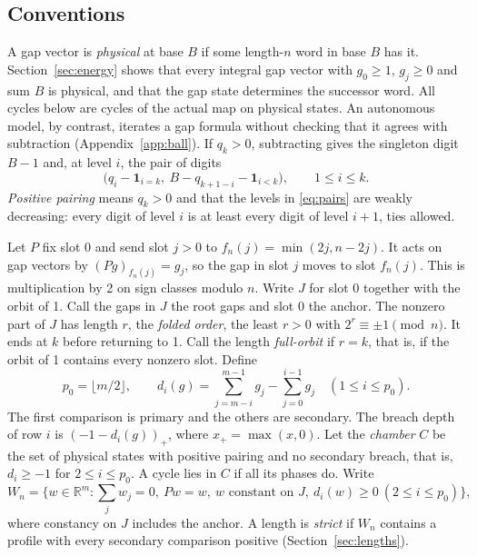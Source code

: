 \documentclass[11pt,reqno]{amsart}
\theoremstyle{definition}
\newcommand{\R}{\mathbb R}
\begin{document}
\subsection*{Conventions}
A gap vector is \emph{physical} at base \(B\) if some length-\(n\) word in base \(B\) has it. Section~\ref{sec:energy} shows that every integral gap vector with \(g_0\ge1\), \(g_j\ge0\) and sum \(B\) is physical, and that the gap state determines the successor word. All cycles below are cycles of the actual map on physical states. An autonomous model, by contrast, iterates a gap formula without checking that it agrees with subtraction (Appendix~\ref{app:ball}). If \(q_k>0\), subtracting gives the singleton digit \(B-1\) and, at level \(i\), the pair of digits
\begin{equation}\label{eq:pairs}
 \big(q_i-\mathbf 1_{i=k},\ B-q_{k+1-i}-\mathbf 1_{i<k}\big),
 \qquad 1\le i\le k .
\end{equation}
\emph{Positive pairing} means \(q_k>0\) and that the levels in \eqref{eq:pairs} are weakly decreasing: every digit of level \(i\) is at least every digit of level \(i+1\), ties allowed.

Let \(P\) fix slot 0 and send slot \(j>0\) to \(f_n(j)=\min(2j,n-2j)\). It acts on gap vectors by \((Pg)_{f_n(j)}=g_j\), so the gap in slot \(j\) moves to slot \(f_n(j)\). This is multiplication by 2 on sign classes modulo \(n\). Write \(J\) for slot 0 together with the orbit of 1. Call the gaps in \(J\) the root gaps and slot 0 the anchor. The nonzero part of \(J\) has length \(r\), the \emph{folded order}, the least \(r>0\) with \(2^r\equiv\pm1\pmod n\). It ends at \(k\) before returning to 1. Call the length \emph{full-orbit} if \(r=k\), that is, if the orbit of 1 contains every nonzero slot. Define
\[
 p_0=\lfloor m/2\rfloor,\qquad
 d_i(g)=\sum_{j=m-i}^{m-1}g_j-\sum_{j=0}^{i-1}g_j
 \quad(1\le i\le p_0).
\]
The first comparison is primary and the others are secondary. The breach depth of row \(i\) is \((-1-d_i(g))_+\), where \(x_+=\max(x,0)\). Let the \emph{chamber} \(C\) be the set of physical states with positive pairing and no secondary breach, that is, \(d_i\ge-1\) for \(2\le i\le p_0\). A cycle lies in \(C\) if all its phases do. Write
\[
 W_n=\{w\in\R^m:\textstyle\sum_j w_j=0,\ Pw=w,\ w\text{ constant on }J,\
                      d_i(w)\ge0\ (2\le i\le p_0)\},
\]
where constancy on \(J\) includes the anchor. A length is \emph{strict} if \(W_n\) contains a profile with every secondary comparison positive (Section~\ref{sec:lengths}).
\end{document}
